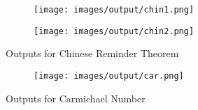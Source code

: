\begin{figure}[H]
    \begin{subfigure}{.5\textwidth}
        \centering
        \texttt{[image: images/output/chin1.png]}
        \caption*{}
        \label{fig:expo1}
    \end{subfigure}
    \begin{subfigure}{.5\textwidth}
        \centering
        \texttt{[image: images/output/chin2.png]}
        \caption*{}
        \label{fig:expo2}
    \end{subfigure}
    \caption{Outputs for Chinese Reminder Theorem}
    \vspace*{10mm}
    \begin{subfigure}{1\textwidth}
        \centering
        \texttt{[image: images/output/car.png]}
        \caption*{}
        \label{fig:expo3}
    \end{subfigure}
    \caption{Outputs for Carmichael Number}
    \label{fig:expo}
\end{figure}